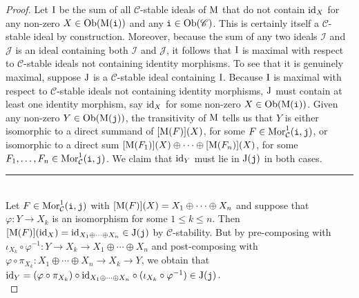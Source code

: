 \noindent\begin{proof} Let $\textup{I}$ be the sum %
of all $\mathscr{C}$-stable ideals of $\textup{M}$ that do not contain $\textup{id}_X$ for any non-zero $X \in \textnormal{Ob}(\textup{M}(\textnormal{\texttt{i}}))$ and any $\textnormal{\texttt{i}} \in \textnormal{Ob}(\mathscr{C})$. This is certainly itself a $\mathscr{C}$-stable ideal by construction. Moreover, because the sum of any two ideals $\mathcal{I}$ and $\mathcal{J}$ is an ideal containing both $\mathcal{I}$ and $\mathcal{J}$, it follows that %
$\textup{I}$ is maximal with respect to $\mathscr{C}$-stable ideals not containing identity morphisms. To see that it is genuinely maximal, suppose $\textup{J}$ is a $\mathscr{C}$-stable ideal containing $\textup{I}$. %
Because $\textup{I}$ is maximal with respect to $\mathscr{C}$-stable ideals not containing identity morphisms, $\textup{J}$ must contain at least one identity morphism, say $\textup{id}_X$ for some non-zero $X \in \textnormal{Ob}(\textup{M}(\textnormal{\texttt{i}}))$. Given any non-zero $Y \in \textnormal{Ob}(\textup{M}(\textnormal{\texttt{j}}))$, the transitivity of $\textup{M}$ tells us that $Y$ is either isomorphic to a direct summand of $[\textup{M}(F)](X)$, for some $F \in \textnormal{Mor}_\mathcal{C}^1(\textnormal{\texttt{i}}, \textnormal{\texttt{j}})$, or isomorphic to a direct sum $[\textup{M}(F_1)](X) \oplus \cdots \oplus [\textup{M}(F_n)](X)$, for some $F_1, \dots, F_n \in \textnormal{Mor}_\mathcal{C}^1(\textnormal{\texttt{i}}, \textnormal{\texttt{j}})$. We claim that $\textup{id}_Y$ must lie in $\textup{J}(\textnormal{\texttt{j}})$ in both cases.\\[-1.5\baselineskip]
\begin{center}
\rule{0.5\linewidth}{1pt}
\end{center}
\noindent\\[-\baselineskip]
\noindent Let $F \in \textnormal{Mor}_\mathcal{C}^1(\textnormal{\texttt{i}}, \textnormal{\texttt{j}})$ with $[\textup{M}(F)](X) = X_1 \oplus \cdots \oplus X_n$ and suppose that $\varphi : Y \to X_k$ is an isomorphism for some $1 \leq k \leq n$. Then $[\textup{M}(F)](\textup{id}_X) = \textup{id}_{X_1 \oplus \cdots \oplus X_n} \in \textup{J}(\textnormal{\texttt{j}})$ by $\mathscr{C}$-stability. But by pre-composing with $\iota_{X_k} \circ \varphi^{-1} : Y \to X_k \to X_1 \oplus \cdots \oplus X_n$ and post-composing with $\varphi \circ \pi_{X_k} : X_1 \oplus \cdots \oplus X_n \to X_k \to Y$, we obtain that $\textup{id}_Y = (\varphi \circ \pi_{X_k}) \circ \textup{id}_{X_1 \oplus \cdots \oplus X_n} \circ (\iota_{X_k} \circ \varphi^{-1}) \in \textup{J}(\textnormal{\texttt{j}})$.\\[-1.5\baselineskip]

\end{proof}
